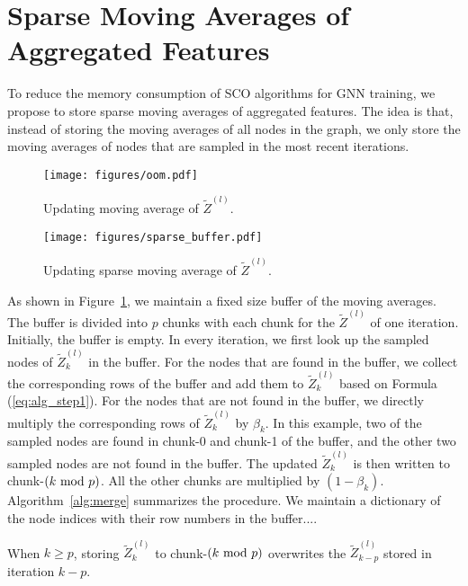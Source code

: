 \section{Sparse Moving Averages of Aggregated Features}
To reduce the memory consumption of SCO algorithms for GNN training, we propose to store sparse moving averages of aggregated features. 
The idea is that, instead of storing the moving averages of all nodes in the graph, we only store the moving averages of nodes that are sampled in the most recent iterations. 

\begin{figure}
  \begin{minipage}{.44\linewidth}
    \centering
  \texttt{[image: figures/oom.pdf]}
  \caption{Updating moving average of $\widetilde{Z}^{(l)}$.}
  \label{fig:oom}
\end{minipage} 
\hfill
\begin{minipage}{.52\linewidth}
  \centering
    \texttt{[image: figures/sparse\_buffer.pdf]}
    \caption{Updating sparse moving average of $\widetilde{Z}^{(l)}$.}
    \label{fig:sparse_buffer}
\end{minipage}
\end{figure}
As shown in Figure~\ref{fig:sparse_buffer}, we maintain a fixed size buffer of the moving averages. 
The buffer is divided into $p$ chunks with each chunk for the $\widetilde{Z}^{(l)}$ of one iteration. 
Initially, the buffer is empty. 
In every iteration, we first look up the sampled nodes of $\widetilde{Z}_k^{(l)}$ in the buffer. 
For the nodes that are found in the buffer, we collect the corresponding rows of the buffer and add them to $\widetilde{Z}_k^{(l)}$ based on Formula (\ref{eq:alg_step1}). 
For the nodes that are not found in the buffer, we directly multiply the corresponding rows of $\widetilde{Z}_k^{(l)}$ by $\beta_k$. 
In this example, two of the sampled nodes are found in chunk-0 and chunk-1 of the buffer, and the other two sampled nodes are not found in the buffer. 
The updated $\widetilde{Z}_k^{(l)}$ is then written to chunk-$(k\ \mathrm{mod}\ p)$.  
All the other chunks are multiplied by $(1-\beta_k)$. 
Algorithm~\ref{alg:merge} summarizes the procedure. 
We maintain a dictionary of the node indices with their row numbers in the buffer....




When $k\ge p$, storing $\widetilde{Z}_k^{(l)}$ to chunk-$(k\ \mathrm{mod}\ p)$ overwrites the $\widetilde{Z}_{k-p}^{(l)}$ stored in iteration $k-p$. 






